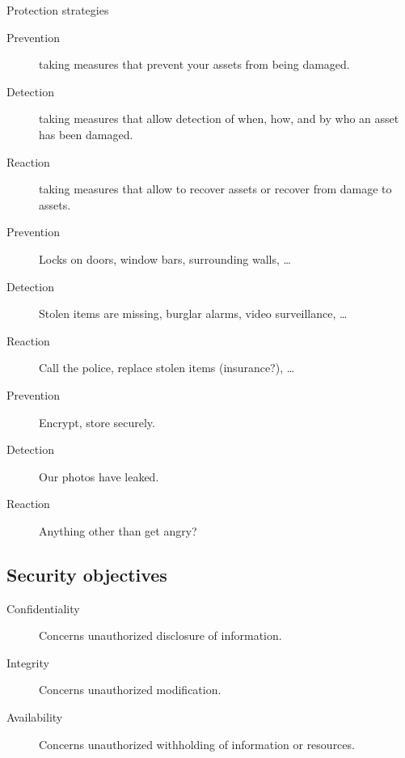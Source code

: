 \begin{frame}
  \begin{block}{Protection strategies}
    \begin{description}
      \item[Prevention] taking measures that prevent your assets from being 
        damaged.

      \item[Detection] taking measures that allow detection of when, how, and 
        by who an asset has been damaged.

      \item[Reaction] taking measures that allow to recover assets or recover 
        from damage to assets.
    \end{description}
  \end{block}
\end{frame}

\begin{frame}
  \begin{example}
    \begin{description}
      \item[Prevention] Locks on doors, window bars, surrounding walls, \dots
      \item[Detection] Stolen items are missing, burglar alarms, video 
        surveillance, \dots
      \item[Reaction] Call the police, replace stolen items (insurance?), \dots
    \end{description}
  \end{example}

  \pause

  \begin{example}
    \begin{description}
      \item[Prevention] Encrypt, store securely.
      \item[Detection] Our photos have leaked.
      \item[Reaction] Anything other than get angry?
    \end{description}
  \end{example}
\end{frame}

\subsection{Security objectives}

\begin{frame}
  \begin{description}
    \item[Confidentiality] Concerns unauthorized disclosure of information.
    \item[Integrity] Concerns unauthorized modification.
    \item[Availability] Concerns unauthorized withholding of information or 
      resources.
  \end{description}
\end{frame}

